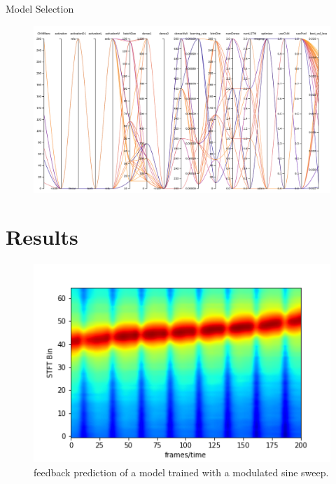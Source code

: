\documentclass{beamer}
\begin{document}
	\begin{frame}{Model Selection}



		\begin{figure}[ht]
			\includegraphics[width=1.\linewidth]{charts/Section-1-Panel-0-epgzprslg}
			\end{figure}



	\end{frame}


	\section{Results}
	\begin{frame}
		\begin{figure}[ht]
		\includegraphics[width=0.6\linewidth]{modSinFbPredict.png}
		\caption{feedback prediction of a model trained with a modulated sine sweep.}
	\end{figure}
	\end{frame}
\end{document}
